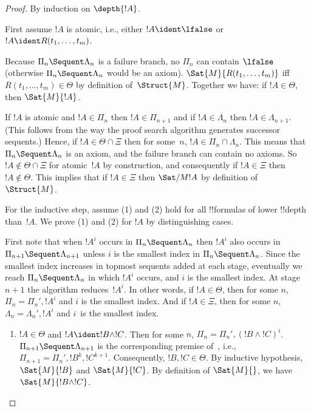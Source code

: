 \documentclass[../../../include/open-logic-section]{subfiles}
\begin{document}
\begin{proof}
  By induction on $\depth{!A}$.

First assume $!A$ is atomic, i.e., either $!A \ident \lfalse$ or $!A
\ident R(t_1, \dots, t_m)$.

Because $\Pi_n \Sequent \Lambda_n$ is a failure branch, no $\Pi_n$ can
contain $\lfalse$ (otherwise $\Pi_n \Sequent \Lambda_n$ would be an
axiom). $\Sat{M}{R(t_1, \dots, t_m)}$ iff $R(t_1, \dots, t_m) \in
\Theta$ by definition of~$\Struct{M}$. Together we have: if $!A \in
\Theta$, then $\Sat{M}{!A}$.

If $!A$ is atomic and $!A \in \Pi_n$ then $!A \in \Pi_{n+1}$ and if
$!A \in \Lambda_n$ then $!A \in \Lambda_{n+1}$. (This follows from the
way the proof search algorithm generates successor sequents.) Hence,
if $!A \in \Theta \cap \Xi$ then for some~$n$, $!A \in \Pi_n \cap
\Lambda_n$. This means that $\Pi_n \Sequent \Lambda_n$ is an axiom,
and the failure branch can contain no axioms. So $!A \notin \Theta
\cap \Xi$ for atomic~$!A$ by construction, and consequently if $!A \in
\Xi$ then $!A \notin \Theta$. This implies that if $!A \in \Xi$ then
$\Sat/{M}{!A}$ by definition of~$\Struct{M}$.

For the inductive step, assume (1) and (2) hold for all !!{formula}s
of lower !!{depth} than~$!A$. We prove (1) and (2) for $!A$ by
distinguishing cases.

First note that when $!A^i$ occurs in $\Pi_n \Sequent \Lambda_n$ then
$!A^i$ also occurs in $\Pi_{n+1} \Sequent \Lambda_{n+1}$ unless $i$ is
the smallest index in $\Pi_n \Sequent \Lambda_n$. Since the smallest
index increases in topmost sequents added at each stage, eventually we
reach $\Pi_n \Sequent \Lambda_n$ in which $!A^i$ occurs, and $i$ is
the smallest index. At stage $n+1$ the algorithm reduces~$!A^i$. In
other words, if $!A \in \Theta$, then for some $n$, $\Pi_n = \Pi_n',
!A^i$ and $i$ is the smallest index. And if $!A \in \Xi$, then for
some $n$, $\Lambda_n = \Lambda_n', !A^i$ and $i$~is the smallest
index.

\begin{enumerate}
  \item $!A \in \Theta$ and $!A \ident !B \land !C$. Then for some
  $n$, $\Pi_n = \Pi_n', (!B \land !C)^i$. $\Pi_{n+1} \Sequent
  \Lambda_{n+1}$ is the corresponding premise of~\LeftR{\land}, i.e.,
  $\Pi_{n+1} = \Pi_n', !B^k, !C^{k+1}$. Consequently, $!B, !C \in
  \Theta$. By inductive hypothesis, $\Sat{M}{!B}$ and $\Sat{M}{!C}$.
  By definition of $\Sat{M}{}$, we have $\Sat{M}{!B \land !C}$.


\end{enumerate}
\end{proof}
\end{document}
